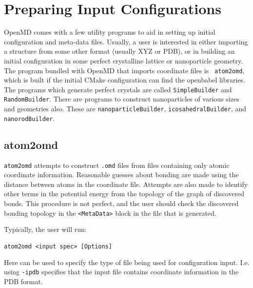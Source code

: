 \documentclass[letterpaper]{report}
\begin{document}
\chapter{\label{section:PreparingInput} Preparing Input Configurations}

OpenMD comes with a few utility programs to aid in setting up
initial configuration and meta-data files.  Usually, a user is
interested in either importing a structure from some other format
(usually XYZ or PDB), or in building an initial configuration in some
perfect crystalline lattice or nanoparticle geometry. The program
bundled with OpenMD that imports coordinate files is {\tt
  atom2omd}, which is built if the initial CMake configuration can find
the openbabel libraries. The programs which generate perfect crystals
are called {\tt SimpleBuilder} and {\tt RandomBuilder}.  There are
programs to construct nanoparticles of various sizes and geometries
also.  These are {\tt nanoparticleBuilder}, {\tt icosahedralBuilder},
and {\tt nanorodBuilder}.

\section{\label{section:atom2omd}atom2omd}

{\tt atom2omd} attempts to construct {\tt .omd} files from files
containing only atomic coordinate information. Reasonable guesses
about bonding are made using the distance between atoms in the
coordinate file.  Attempts are also made to identify other terms in
the potential energy from the topology of the graph of discovered
bonds.  This procedure is not perfect, and the user should check the
discovered bonding topology in the {\tt <MetaData>} block in the
file that is generated.

Typically, the user will run:

{\tt atom2omd <input spec> [Options]}

Here {\tt <input spec>} can be used to specify the type of file being
used for configuration input. I.e. using {\tt -ipdb} specifies that the
input file contains coordinate information in the PDB format.
\end{document}
